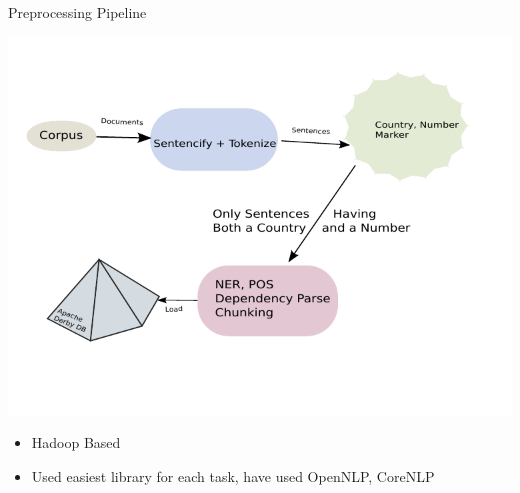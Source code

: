 \documentclass{beamer}
\begin{document}
\begin{frame}{Preprocessing Pipeline}
 \begin{center}
 \includegraphics{./imgs/pipeline.pdf}
\end{center}

\end{frame}
\begin{frame}
 \begin{itemize}
  \item Hadoop Based
  \item Used easiest library for each task, have used OpenNLP, CoreNLP
 \end{itemize}

\end{frame}
\end{document}

